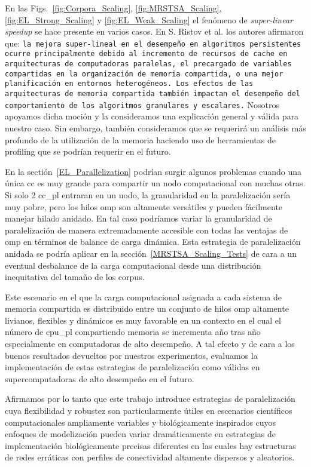 En las Figs.~\ref{fig:Corpora_Scaling}, \ref{fig:MRSTSA_Scaling}, \ref{fig:EL_Strong_Scaling} y \ref{fig:EL_Weak_Scaling} el fenómeno de \emph{super-linear speedup} se hace presente en varios casos.
En S. Ristov et al. \cite{7733347} los autores afirmaron que: \texttt{la mejora super-lineal en el desempeño en algoritmos persistentes ocurre principalmente debido al incremento de recursos de cache en arquitecturas de computadoras paralelas, el precargado de variables compartidas en la organización de memoria compartida, o una mejor planificación en entornos heterogéneos.
Los efectos de las arquitecturas de memoria compartida también impactan el desempeño del comportamiento de los algoritmos granulares y escalares.}
Nosotros apoyamos dicha moción y la consideramos una explicación general y válida para nuestro caso. Sin embargo, también consideramos que se requerirá un análisis más profundo de la utilización de la memoria haciendo uso de herramientas de profiling que se podrían requerir en el futuro.

En la sectión~\ref{EL_Parallelization} podrían surgir algunos problemas cuando una única \gls{cc} es muy grande para compartir un nodo computacional con muchas otras.
Si solo 2 \gls{cc_pl} entraran en un nodo, la granularidad en la paralelización sería muy pobre, pero los hilos \gls{omp} son altamente versátiles y pueden fácilmente  manejar hilado anidado.
En tal caso podríamos variar la granularidad de paralelización de manera extremadamente accesible con todas las ventajas de \gls{omp} en términos de balance de carga dinámica.
Esta estrategia de paralelización anidada se podría aplicar en la sección~\ref{MRSTSA_Scaling_Tests} de cara a un eventual desbalance de la carga computacional desde una distribución inequitativa del tamaño de los corpus.

Este escenario en el que la carga computacional asignada a cada sistema de memoria compartida es distribuido entre un conjunto de hilos \gls{omp} altamente livianos, flexibles y dinámicos es muy favorable en un contexto en el cual el número de \gls{cpu_pl} compartiendo memoria se incrementa año tras año especialmente en computadoras de alto desempeño.
A tal efecto y de cara a los buenos resultados devueltos por nuestros experimentos, evaluamos la implementación de estas estrategias de paralelización como válidas en supercomputadoras de alto desempeño en el futuro.

Afirmamos por lo tanto que este trabajo introduce estrategias de paralelización cuya flexibilidad y robustez son particularmente útiles en escenarios científicos computacionales ampliamente variables y biológicamente inspirados cuyos enfoques de modelización pueden variar dramáticamente en estrategias de implementación biológicamente precisas diferentes en las cuales hay estructuras de redes erráticas con perfiles de conectividad altamente dispersos y aleatorios.








